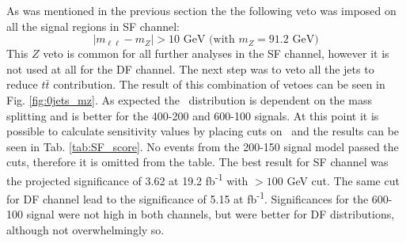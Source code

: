As was mentioned in the previous section the the following veto was imposed on all the signal regions in SF channel:
\begin{equation*}
|m_{\ell \ell} - m_Z| > 10 \text{ GeV (with } m_Z = 91.2 \text{ GeV}) 
\end{equation*}
This $Z$ veto is common for all further analyses in the SF channel, however it is not used at all for the DF channel.
The next step was to veto all the jets to reduce $t\bar{t}$ contribution. The result of this combination of vetoes can be seen in Fig. \ref{fig:0jets_mz}. As expected the \mttwo \, distribution is dependent on the mass splitting and is better for the 400-200 and 600-100 signals. At this point it is possible to calculate sensitivity values by placing cuts on \mttwo \, and the results can be seen in Tab. \ref{tab:SF_score}. No events from the 200-150 signal model passed the cuts, therefore it is omitted from the table. The best result for SF channel was the projected significance of 3.62 at 19.2 fb\textsuperscript{-1}  with \mttwo$>100$ GeV cut. The same cut for DF channel lead to the significance of 5.15  at  fb\textsuperscript{-1}. Significances for the 600-100 signal were not high in both channels, but were better for DF distributions, although not overwhelmingly so. 

